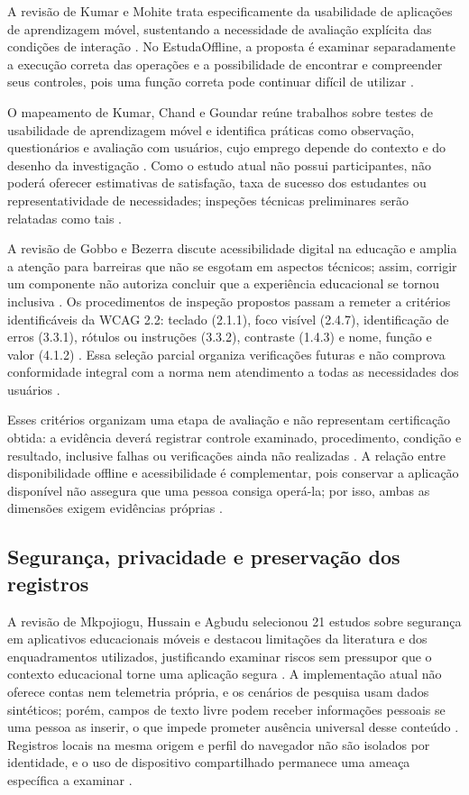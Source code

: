A revisão de Kumar e Mohite trata especificamente da usabilidade de aplicações de aprendizagem móvel, sustentando a necessidade de avaliação explícita das condições de interação \citep{kumar2017}.
No EstudaOffline, a proposta é examinar separadamente a execução correta das operações e a possibilidade de encontrar e compreender seus controles, pois uma função correta pode continuar difícil de utilizar \citep{kumar2017}.

O mapeamento de Kumar, Chand e Goundar reúne trabalhos sobre testes de usabilidade de aprendizagem móvel e identifica práticas como observação, questionários e avaliação com usuários, cujo emprego depende do contexto e do desenho da investigação \citep{kumarmapping2024}.
Como o estudo atual não possui participantes, não poderá oferecer estimativas de satisfação, taxa de sucesso dos estudantes ou representatividade de necessidades; inspeções técnicas preliminares serão relatadas como tais \citep{kumarmapping2024}.

A revisão de Gobbo e Bezerra discute acessibilidade digital na educação e amplia a atenção para barreiras que não se esgotam em aspectos técnicos; assim, corrigir um componente não autoriza concluir que a experiência educacional se tornou inclusiva \citep{gobbo2023}.
Os procedimentos de inspeção propostos passam a remeter a critérios identificáveis da WCAG 2.2: teclado (2.1.1), foco visível (2.4.7), identificação de erros (3.3.1), rótulos ou instruções (3.3.2), contraste (1.4.3) e nome, função e valor (4.1.2) \citep{wcag}.
Essa seleção parcial organiza verificações futuras e não comprova conformidade integral com a norma nem atendimento a todas as necessidades dos usuários \citep{wcag}.

Esses critérios organizam uma etapa de avaliação e não representam certificação obtida: a evidência deverá registrar controle examinado, procedimento, condição e resultado, inclusive falhas ou verificações ainda não realizadas \citep{eng06}.
A relação entre disponibilidade offline e acessibilidade é complementar, pois conservar a aplicação disponível não assegura que uma pessoa consiga operá-la; por isso, ambas as dimensões exigem evidências próprias \citep{martin2024,kumar2017}.

\subsection{Segurança, privacidade e preservação dos registros}
A revisão de Mkpojiogu, Hussain e Agbudu selecionou 21 estudos sobre segurança em aplicativos educacionais móveis e destacou limitações da literatura e dos enquadramentos utilizados, justificando examinar riscos sem pressupor que o contexto educacional torne uma aplicação segura \citep{OS18}.
A implementação atual não oferece contas nem telemetria própria, e os cenários de pesquisa usam dados sintéticos; porém, campos de texto livre podem receber informações pessoais se uma pessoa as inserir, o que impede prometer ausência universal desse conteúdo .
Registros locais na mesma origem e perfil do navegador não são isolados por identidade, e o uso de dispositivo compartilhado permanece uma ameaça específica a examinar \citep{local}.

